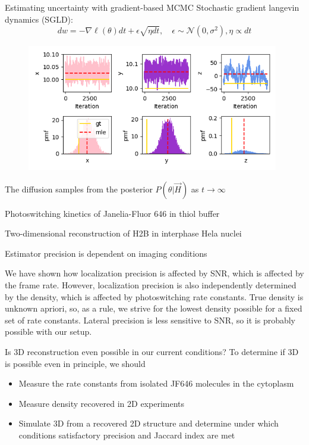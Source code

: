 \documentclass{beamer}					%
\begin{document}
\begin{frame}{Estimating uncertainty with gradient-based MCMC}
Stochastic gradient langevin dynamics (SGLD): $$dw = - \nabla \ell(\theta) dt + \epsilon \sqrt{\eta dt}, \quad \epsilon \sim \mathcal N(0, \sigma^2), \eta \propto dt$$
\begin{figure}
\includegraphics[width=11cm]{SGLD.png}
\end{figure}
The diffusion samples from the posterior $P(\theta|\vec{H})$ as $t\rightarrow\infty$

\end{frame}

\begin{frame}{Photoswitching kinetics of Janelia-Fluor 646 in thiol buffer}


\end{frame}

\begin{frame}{Two-dimensional reconstruction of H2B in interphase Hela nuclei}


\end{frame}

\begin{frame}{Estimator precision is dependent on imaging conditions}

We have shown how localization precision is affected by SNR, which is affected by the frame rate. However, localization precision is also independently determined by the density, which is affected by photoswitching rate constants. True density is unknown apriori, so, as a rule, we strive for the lowest density possible for a fixed set of rate constants. Lateral precision is less sensitive to SNR, so it is probably possible with our setup. 


\end{frame}

\begin{frame}{Is 3D reconstruction even possible in our current conditions?}
To determine if 3D is possible even in principle, we should 

\begin{itemize}
\item Measure the rate constants from isolated JF646 molecules in the cytoplasm
\item Measure density recovered in 2D experiments
\item Simulate 3D from a recovered 2D structure and determine under which conditions satisfactory precision and Jaccard index are met
\end{itemize}
\end{frame}
\end{document}
